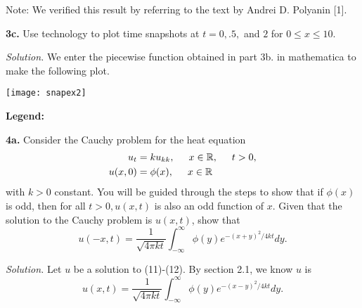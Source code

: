 \documentclass{article}
\begin{document}
Note: We verified this result by referring to the text by Andrei D. Polyanin [1]. 





\newpage




\vspace{9mm}
\textbf{3c.} Use technology to plot time snapshots at \(t=0, .5,\) and \(2\) for \( 0 \leq x\leq 10\). 

\vspace{3mm}
\textit{Solution.} We enter the piecewise function obtained in part 3b. in mathematica to make the following plot.

\vspace{10mm}
\begin{centering}
\texttt{[image: snapex2]}
\end{centering}


\begin{tcolorbox}
\textbf{Legend:} \hspace{20mm}  \hspace{20mm}   \hspace{20mm} 
\end{tcolorbox}






\newpage
\textbf{4a.} Consider the Cauchy problem for the heat equation
\begin{align}
u_t&=ku_{kk}, \hspace{5mm} x\in \mathbb{R}, \hspace{5mm} t>0, \\
u(x,0)&= \phi(x), \hspace{5mm} x\in \mathbb{R}
\end{align}
with \(k>0\) constant. You will be guided through the steps to show that if \(\phi(x)\) is odd, then for all \(t>0,u(x,t) \) is also an odd function of \(x\). Given that the solution to the Cauchy problem is \(u(x,t)\), show that
\[ u(-x,t)=\frac{1}{ \sqrt{4\pi kt} } \int_{-\infty}^{\infty} \phi(y) e^{-(x+y)^2 /4kt } dy. \]

\vspace{3mm}
\textit{Solution.} Let \(u\) be a solution to (11)-(12).  By section 2.1, we know \(u\) is
\[u(x,t)= \frac{1}{ \sqrt{4\pi kt} } \int_{-\infty}^{\infty} \phi(y) e^{-(x-y)^2 /4kt } dy.  \]
\end{document}
